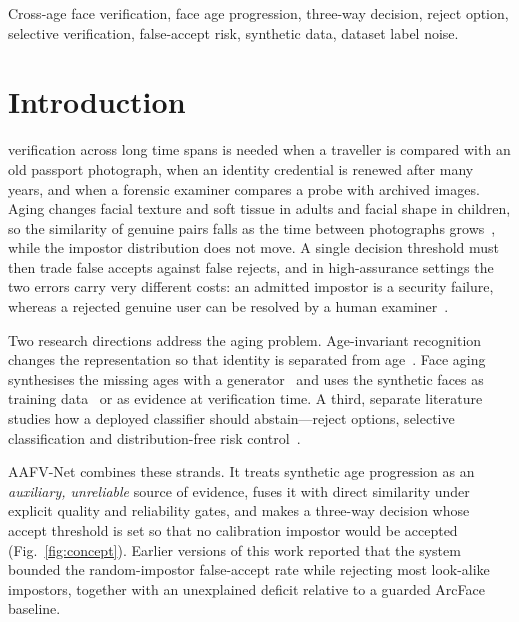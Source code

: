 \documentclass[journal]{IEEEtran}
\begin{document}
\begin{IEEEkeywords}
Cross-age face verification, face age progression, three-way decision, reject option, selective verification, false-accept risk, synthetic data, dataset label noise.
\end{IEEEkeywords}

\section{Introduction}
 verification across long time spans is needed when a traveller is compared with an old passport photograph, when an identity credential is renewed after many years, and when a forensic examiner compares a probe with archived images. Aging changes facial texture and soft tissue in adults and facial shape in children, so the similarity of genuine pairs falls as the time between photographs grows~\cite{bestrowden2018longitudinal,deb2018child}, while the impostor distribution does not move. A single decision threshold must then trade false accepts against false rejects, and in high-assurance settings the two errors carry very different costs: an admitted impostor is a security failure, whereas a rejected genuine user can be resolved by a human examiner~\cite{phillips2018pnas}.

Two research directions address the aging problem. Age-invariant recognition changes the representation so that identity is separated from age~\cite{li2011aifr,wang2018oecnn,wang2019dal,huang2021mtlface,zhao2022aim,wang2025ordcon}. Face aging synthesises the missing ages with a generator~\cite{zhang2017caae,tang2018ipcgan,huang2021pfagan,orel2020lifespan,alaluf2021sam,chen2023fading} and uses the synthetic faces as training data~\cite{huang2022mtlfacetpami,banerjee2023aging} or as evidence at verification time. A third, separate literature studies how a deployed classifier should abstain---reject options, selective classification and distribution-free risk control~\cite{chow1970reject,geifman2017selective,angelopoulos2024crc}.

AAFV-Net combines these strands. It treats synthetic age progression as an \emph{auxiliary, unreliable} source of evidence, fuses it with direct similarity under explicit quality and reliability gates, and makes a three-way decision whose accept threshold is set so that no calibration impostor would be accepted (Fig.~\ref{fig:concept}). Earlier versions of this work reported that the system bounded the random-impostor false-accept rate while rejecting most look-alike impostors, together with an unexplained deficit relative to a guarded ArcFace baseline.
\end{document}
